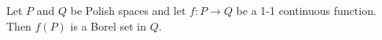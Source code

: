 Let $P$ and $Q$ be Polish spaces and let $f: P \to Q$ be a 1-1 continuous function. Then $f(P)$ is a Borel set in $Q$.
